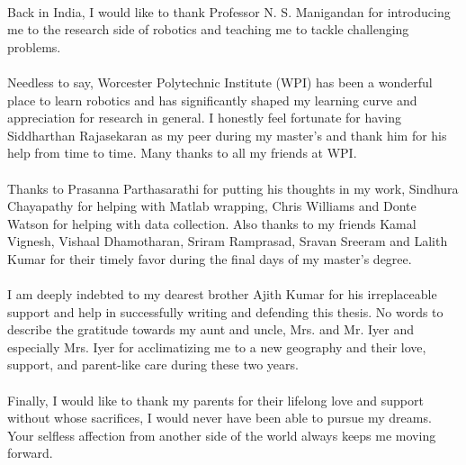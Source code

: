 \documentclass[a4paper, 11pt, oneside]{Thesis}  %
\begin{document}
{\paragraph{}
Back in India, I would like to thank Professor N. S. Manigandan for introducing me to the research side of robotics and teaching me to tackle challenging problems. 
\paragraph{}
Needless to say, Worcester Polytechnic Institute (WPI) has been a wonderful place to learn robotics and has significantly shaped my learning curve and appreciation for research in general. I honestly feel fortunate for having Siddharthan Rajasekaran as my peer during my master's and thank him for his help from time to time. Many thanks to all my friends at WPI.
\paragraph{}
Thanks to Prasanna Parthasarathi for putting his thoughts in my work, Sindhura Chayapathy for helping with Matlab wrapping, Chris Williams and Donte Watson for helping with data collection.
Also thanks to my friends Kamal Vignesh, Vishaal Dhamotharan, Sriram Ramprasad, Sravan Sreeram and Lalith Kumar for their timely favor during the final days of my master's degree.
\paragraph{}
I am deeply indebted to my dearest brother Ajith Kumar for his irreplaceable support and help in successfully writing and defending this thesis. No words to describe the gratitude towards my aunt and uncle, Mrs. and Mr. Iyer and especially Mrs. Iyer for acclimatizing me to a new geography and their love, support, and parent-like care during these two years.
\paragraph{}
Finally, I would like to thank my parents for their lifelong love and support without whose sacrifices, I would never have been able to pursue my dreams. Your selfless affection from another side of the world always keeps me moving forward.
}
\clearpage  %

\pagestyle{fancy}  %
\end{document}
